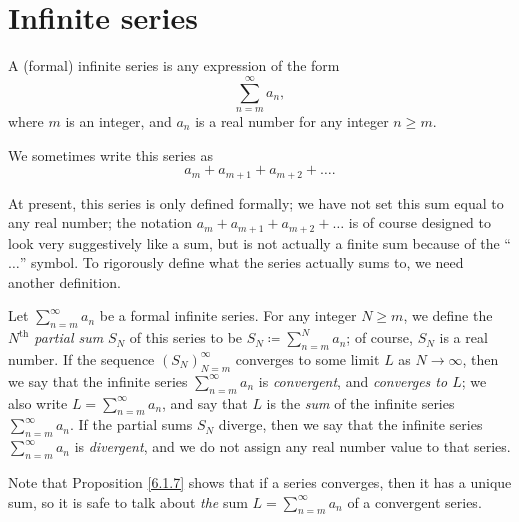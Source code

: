 \section{Infinite series}\label{sec 7.2}

\begin{definition}\label{7.2.1}
    A (formal) infinite series is any expression of the form
    \[
        \sum_{n = m}^\infty a_n,
    \]
    where \(m\) is an integer, and \(a_n\) is a real number for any integer \(n \geq m\).
\end{definition}

\begin{note}
    We sometimes write this series as
    \[
        a_m + a_{m + 1} + a_{m + 2} + \dots.
    \]
\end{note}

\begin{note}
    At present, this series is only defined formally;
    we have not set this sum equal to any real number;
    the notation \(a_m + a_{m + 1} + a_{m + 2} + \dots\) is of course designed to look very suggestively like a sum, but is not actually a finite sum because of the ``\(\dots\)'' symbol.
    To rigorously define what the series actually sums to, we need another definition.
\end{note}

\begin{definition}\label{7.2.2}
    Let \(\sum_{n = m}^\infty a_n\) be a formal infinite series.
    For any integer \(N \geq m\), we define the \emph{\(N^{\text{th}}\) partial sum} \(S_N\) of this series to be \(S_N \coloneqq \sum_{n = m}^N a_n\);
    of course, \(S_N\) is a real number.
    If the sequence \((S_N)_{N = m}^\infty\) converges to some limit \(L\) as \(N \to \infty\), then we say that the infinite series \(\sum_{n = m}^\infty a_n\) is \emph{convergent}, and \emph{converges to \(L\)};
    we also write \(L = \sum_{n = m}^\infty a_n\), and say that \(L\) is the \emph{sum} of the infinite series \(\sum_{n = m}^\infty a_n\).
    If the partial sums \(S_N\) diverge, then we say that the infinite series \(\sum_{n = m}^\infty a_n\) is \emph{divergent}, and we do not assign any real number value to that series.
\end{definition}

\begin{remark}\label{7.2.3}
    Note that Proposition \ref{6.1.7} shows that if a series converges, then it has a unique sum, so it is safe to talk about \emph{the} sum \(L = \sum_{n = m}^\infty a_n\) of a convergent series.
\end{remark}

